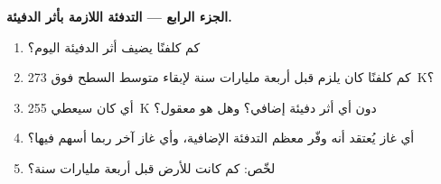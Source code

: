 \begin{problem}
\medskip
\noindent\textbf{الجزء الرابع --- التدفئة اللازمة بأثر الدفيئة.}
\begin{enumerate}[resume]
  \item كم كلفنًا يضيف أثر الدفيئة اليوم؟
  \item كم كلفنًا كان يلزم قبل أربعة مليارات سنة لإبقاء متوسط
        السطح فوق \qty{273}{K}؟
  \item أي  كان سيعطي \qty{255}{K} دون أي أثر دفيئة
        إضافي؟ وهل هو معقول؟
  \item أي غاز يُعتقد أنه وفّر معظم التدفئة الإضافية، وأي
        غاز آخر ربما أسهم فيها؟
  \item لخّص: كم كانت  للأرض قبل أربعة مليارات
        سنة؟
\end{enumerate}
\end{problem}
